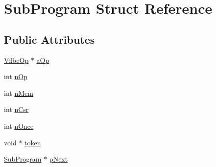 \hypertarget{struct_sub_program}{\section{Sub\-Program Struct Reference}
\label{struct_sub_program}
}
\subsection*{Public Attributes}
\begin{DoxyCompactItemize}
\item 
\hyperlink{struct_vdbe_op}{Vdbe\-Op} $\ast$ \hyperlink{struct_sub_program_aa9bb1992fed633d182076a35d6448c7d}{a\-Op}
\item 
int \hyperlink{struct_sub_program_a6fe204a75ab8254c453be77f024b6d69}{n\-Op}
\item 
int \hyperlink{struct_sub_program_a9bece42fdeb81085809d7c2f8aa05616}{n\-Mem}
\item 
int \hyperlink{struct_sub_program_a83b18aa5cc63aecdbf996c16af1e48bb}{n\-Csr}
\item 
int \hyperlink{struct_sub_program_a907d5933dd0149be1ef90fcbe91e3c58}{n\-Once}
\item 
void $\ast$ \hyperlink{struct_sub_program_aaea3b67899b092476b107d22a4e2022d}{token}
\item 
\hyperlink{struct_sub_program}{Sub\-Program} $\ast$ \hyperlink{struct_sub_program_a7da35488ac58a64fa30b88da56aac8b3}{p\-Next}
\end{DoxyCompactItemize}


